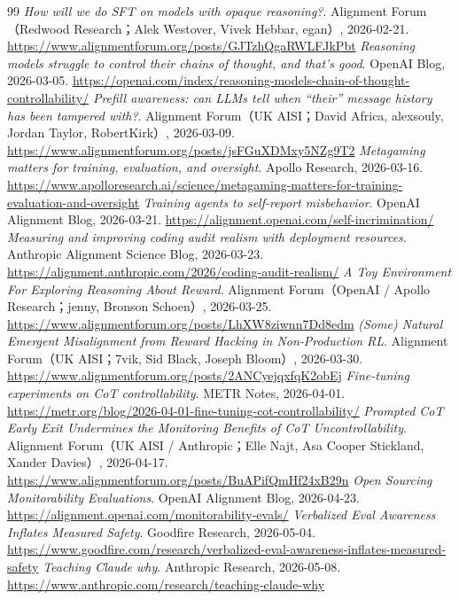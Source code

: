\begin{thebibliography}{99}
 \textit{How will we do SFT on models with opaque reasoning?}. Alignment Forum（Redwood Research；Alek Westover, Vivek Hebbar, egan）, 2026-02-21. \url{https://www.alignmentforum.org/posts/GJTzhQgaRWLFJkPbt}
 \textit{Reasoning models struggle to control their chains of thought, and that’s good}. OpenAI Blog, 2026-03-05. \url{https://openai.com/index/reasoning-models-chain-of-thought-controllability/}
 \textit{Prefill awareness: can LLMs tell when “their” message history has been tampered with?}. Alignment Forum（UK AISI；David Africa, alexsouly, Jordan Taylor, RobertKirk）, 2026-03-09. \url{https://www.alignmentforum.org/posts/jsFGuXDMxy5NZg9T2}
 \textit{Metagaming matters for training, evaluation, and oversight}. Apollo Research, 2026-03-16. \url{https://www.apolloresearch.ai/science/metagaming-matters-for-training-evaluation-and-oversight}
 \textit{Training agents to self-report misbehavior}. OpenAI Alignment Blog, 2026-03-21. \url{https://alignment.openai.com/self-incrimination/}
 \textit{Measuring and improving coding audit realism with deployment resources}. Anthropic Alignment Science Blog, 2026-03-23. \url{https://alignment.anthropic.com/2026/coding-audit-realism/}
 \textit{A Toy Environment For Exploring Reasoning About Reward}. Alignment Forum（OpenAI / Apollo Research；jenny, Bronson Schoen）, 2026-03-25. \url{https://www.alignmentforum.org/posts/LhXW8ziwnn7Dd8edm}
 \textit{(Some) Natural Emergent Misalignment from Reward Hacking in Non-Production RL}. Alignment Forum（UK AISI；7vik, Sid Black, Joseph Bloom）, 2026-03-30. \url{https://www.alignmentforum.org/posts/2ANCyejqxfqK2obEj}
 \textit{Fine-tuning experiments on CoT controllability}. METR Notes, 2026-04-01. \url{https://metr.org/blog/2026-04-01-fine-tuning-cot-controllability/}
 \textit{Prompted CoT Early Exit Undermines the Monitoring Benefits of CoT Uncontrollability}. Alignment Forum（UK AISI / Anthropic；Elle Najt, Asa Cooper Stickland, Xander Davies）, 2026-04-17. \url{https://www.alignmentforum.org/posts/BuAPifQmHf24xB29n}
 \textit{Open Sourcing Monitorability Evaluations}. OpenAI Alignment Blog, 2026-04-23. \url{https://alignment.openai.com/monitorability-evals/}
 \textit{Verbalized Eval Awareness Inflates Measured Safety}. Goodfire Research, 2026-05-04. \url{https://www.goodfire.com/research/verbalized-eval-awareness-inflates-measured-safety}
 \textit{Teaching Claude why}. Anthropic Research, 2026-05-08. \url{https://www.anthropic.com/research/teaching-claude-why}

\end{thebibliography}
